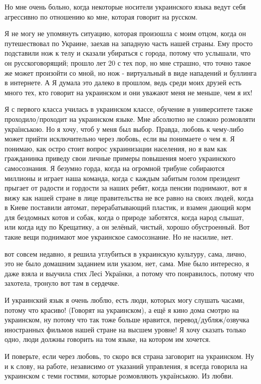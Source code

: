 Но мне очень больно, когда некоторые носители украинского языка ведут себя
агрессивно по отношению ко мне, которая говорит на русском. 

Я не могу не упомянуть ситуацию, которая произошла с моим отцом, когда он
путешествовал по Украине, заехав на западную часть нашей страны. Ему просто
подставили нож к телу и сказали убираться с города, потому что услышали, что он
русскоговорящий; прошло лет 20 с тех пор, но мне страшно, что точно такое же
может произойти со мной, но нож - виртуальный в виде нападений и буллинга в
интернете. А Я думала это далеко в прошлом, ведь среди моих друзей есть много
тех, кто говорит на украинском и они уважают меня не меньше, чем я их! 

Я с первого класса училась в украинском классе, обучение в университете также
проходило/проходит на украинском языке. Мне абсолютно не сложно розмовляти
українською. Но я хочу, чтоб у меня был выбор. Правда, любовь к чему-либо может
прийти исключительно через любовь, если вы понимаете о чем я. Я понимаю, как
остро стоит вопрос украинизации населения, но я вам как гражданинка приведу
свои личные примеры повышения моего украинского самосознания. Я безумно горда,
когда на огромной трибуне собираются миллионы и играет наша команда, когда с
каждым забитым голом президент прыгает от радости и гордости за наших ребят,
когда пенсии поднимают, вот я вижу как нашей стране в лице правительства не все
равно на своих людей,  когда в Киеве поставили автомат, перерабатывающий
пластик, и взамен дающий корм для бездомных котов и собак, когда о природе
заботятся, когда народ слышат, или когда иду по Крещатику, а он зелёный,
чистый, хорошо обустроенный. Вот такие вещи поднимают мое украинское
самосознание. Но не насилие, нет. 

вот совсем недавно, я решила углубиться в украинскую культуру, сама, лично, это
не было домашним заданием или указом, нет, сама. Мне было интересно, я даже
взяла и выучила стих Лесі Українки, а потому что понравилось, потому что
захотела, тронуло вот там в сердечке. 

И украинский язык я очень люблю, есть люди, которых могу слушать часами, потому
что красиво! (Говорят на украинском), а ещё я кино дома смотрю на украинском,
ну потому что так тоже больше нравится, перевод/дубляж/озвучка иностранных
фильмов нашей стране на высшем уровне! Я хочу сказать только одно, люди должны
говорить на том языке, на котором им хочется. 

И поверьте, если через любовь, то скоро вся страна заговорит на украинском. Ну
и к слову, на работе, независимо от указаний управления, я всегда говорила на
украинском с теми гостями, которые розмовляють українською.  Из любви. 

